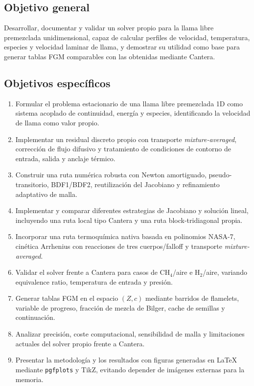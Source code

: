 \documentclass[12pt,a4paper]{article}
\begin{document}
\subsection{Objetivo general}

Desarrollar, documentar y validar un solver propio para la llama libre premezclada unidimensional, capaz de calcular perfiles de velocidad, temperatura, especies y velocidad laminar de llama, y demostrar su utilidad como base para generar tablas FGM comparables con las obtenidas mediante Cantera.

\subsection{Objetivos específicos}

\begin{enumerate}
  \item Formular el problema estacionario de una llama libre premezclada 1D como sistema acoplado de continuidad, energía y especies, identificando la velocidad de llama como valor propio.
  \item Implementar un residual discreto propio con transporte \textit{mixture-averaged}, corrección de flujo difusivo y tratamiento de condiciones de contorno de entrada, salida y anclaje térmico.
  \item Construir una ruta numérica robusta con Newton amortiguado, pseudo-transitorio, BDF1/BDF2, reutilización del Jacobiano y refinamiento adaptativo de malla.
  \item Implementar y comparar diferentes estrategias de Jacobiano y solución lineal, incluyendo una ruta local tipo Cantera y una ruta block-tridiagonal propia.
  \item Incorporar una ruta termoquímica nativa basada en polinomios NASA-7, cinética Arrhenius con reacciones de tres cuerpos/falloff y transporte \textit{mixture-averaged}.
  \item Validar el solver frente a Cantera para casos de CH$_4$/aire e H$_2$/aire, variando equivalence ratio, temperatura de entrada y presión.
  \item Generar tablas FGM en el espacio $(Z,c)$ mediante barridos de flamelets, variable de progreso, fracción de mezcla de Bilger, cache de semillas y continuación.
  \item Analizar precisión, coste computacional, sensibilidad de malla y limitaciones actuales del solver propio frente a Cantera.
  \item Presentar la metodología y los resultados con figuras generadas en LaTeX mediante \texttt{pgfplots} y TikZ, evitando depender de imágenes externas para la memoria.
\end{enumerate}
\end{document}
